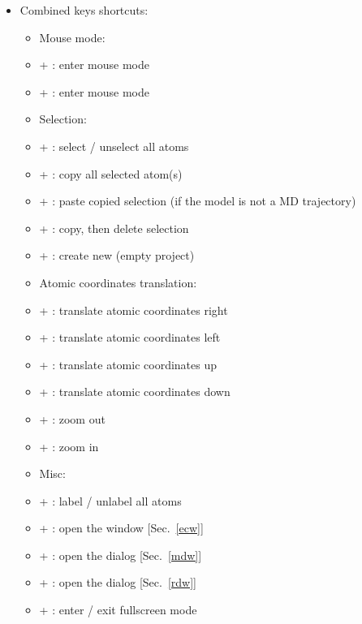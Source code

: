 {\begin{itemize}
\begin{itemize}
\item[] \Del : Delete all selected atom(s)
\end{itemize}
\newpage
\item Combined keys shortcuts:
\begin{itemize}
\item Mouse mode:
\item[] \Alt +  : enter mouse  mode
\item[] \Alt +  : enter mouse  mode \\
\item Selection:
\item[] \Ctrl +  : select / unselect all atoms
\item[] \Ctrl +  : copy all selected atom(s)
\item[] \Ctrl +  : paste copied selection (if the model is not a MD trajectory)
\item[] \Ctrl +  : copy, then delete selection
\item[] \Ctrl +  : create new (empty project) \\
\item Atomic coordinates translation:
\item[] \Ctrl + \RArrow : translate atomic coordinates right
\item[] \Ctrl + \LArrow : translate atomic coordinates left
\item[] \Ctrl + \UArrow : translate atomic coordinates up
\item[] \Ctrl + \DArrow : translate atomic coordinates down
\item[] \Shift + \UArrow : zoom out
\item[] \Shift + \DArrow : zoom in \\
\item Misc:
\item[] \Ctrl +  : label / unlabel all atoms 
\item[] \Ctrl +  : open the  window [Sec.~\ref{ecw}]
\item[] \Ctrl +  : open the  dialog [Sec.~\ref{mdw}]
\item[] \Ctrl +  : open the  dialog [Sec.~\ref{rdw}]
\item[] \Ctrl +  : enter / exit fullscreen mode 
\end{itemize}
\end{itemize}}

